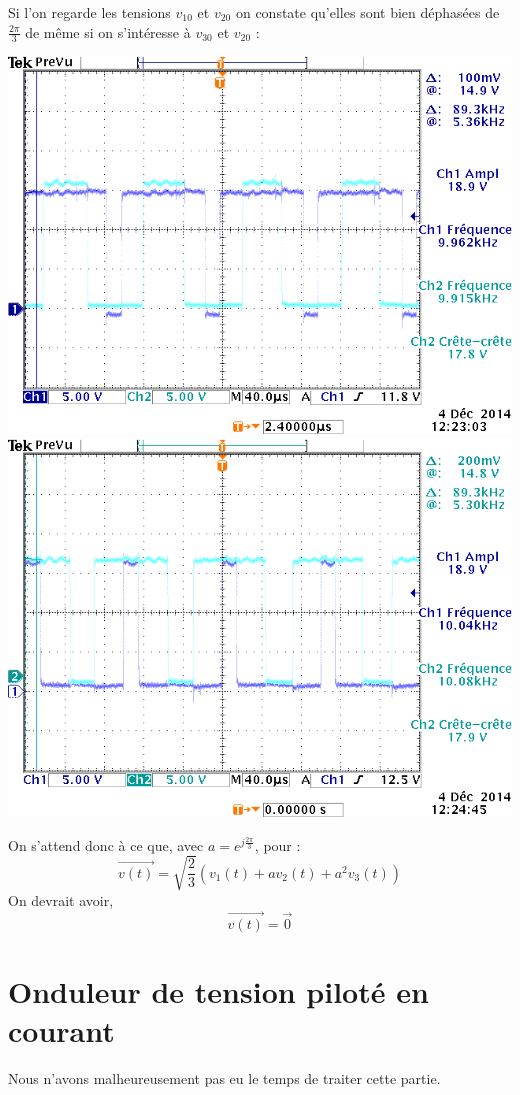 \documentclass[10pt,a4paper]{article}
\begin{document}
	\bigbreak
	\bigbreak
	Si l'on regarde les tensions $v_{10}$ et $v_{20}$ on constate qu'elles sont bien déphasées de $\frac{2\pi}{3}$ de même si on s'intéresse à $v_{30}$ et $v_{20}$ :
	\begin{center}
	\includegraphics[scale=0.3]{v120.png}
	\includegraphics[scale=0.3]{v230.png}
	\end{center}
	On s'attend donc à ce que, avec $a = e^{j\frac{2\pi}{3}}$, pour :
	\[\vec{v(t)} = \sqrt{\frac{2}{3}}(v_1(t)+av_2(t)+a^2v_3(t))\] 
	On devrait avoir,
	\[\vec{v(t)}=\vec{0}\]
	
	\section{Onduleur de tension piloté en courant}
	Nous n'avons malheureusement pas eu le temps de traiter cette partie.
\end{document}
